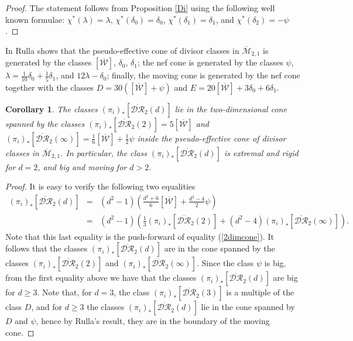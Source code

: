\documentclass[10pt]{amsart}
\newtheorem{cor}{Corollary}[section]
\theoremstyle{definition}
\begin{document}
\begin{proof}
 The statement follows from Proposition \ref{Di} using the following well known formulae: $\chi^*(\lambda)=\lambda$, $\chi^*(\delta_0)=\delta_0$, $\chi^*(\delta_1)=\delta_1$, and $\chi^*(\delta_2)=-\psi$.
\end{proof}

In \cite{MR2216265} Rulla shows that the pseudo-effective cone of divisor classes in ${\overline{\mathcal{M}}}_{2,1}$ is generated by the classes $\left[\overline{\mathcal{W}}\right]$, $\delta_0$, $\delta_1$; the nef cone is generated by the classes $\psi$, $\lambda=\frac{1}{10}\delta_0+\frac{1}{5}\delta_1$, and $12\lambda-\delta_0$; finally, the moving cone is generated by the nef cone together with the classes $D=30\left(\left[\overline{\mathcal{W}}\right]+\psi\right)$ and $E=20\left[\overline{\mathcal{W}}\right]+3\delta_0+6\delta_1$. 

\begin{cor}
The classes $(\pi_i)_*\left[ \overline{\mathcal{DR}}_2(d) \right]$ lie in the two-dimensional cone spanned by the classes $(\pi_i)_*\left[ \overline{\mathcal{DR}}_2(2) \right]=5\left[\overline{\mathcal{W}}\right]$ and $(\pi_i)_*\left[ \overline{\mathcal{DR}}_2(\infty) \right]=\frac{1}{6}\left[\overline{\mathcal{W}}\right]+\frac{1}{2}\psi$ inside the pseudo-effective cone of divisor classes in ${\overline{\mathcal{M}}}_{2,1}$. In particular, the class $(\pi_i)_*\left[ \overline{\mathcal{DR}}_2(d) \right]$ is extremal and rigid for $d=2$, and big and moving for $d>2$.
\end{cor}

\begin{proof}
It is easy to verify the following two equalities
\begin{eqnarray*}
 (\pi_i)_*\left[ \overline{\mathcal{DR}}_2(d) \right] &=& (d^2-1) \left(\frac{d^2+6}{6} \left[\overline{\mathcal{W}}\right] + \frac{d^2-4}{2}\psi\right) \\
&=& (d^2-1)\left(\frac{1}{3}(\pi_i)_*\left[ \overline{\mathcal{DR}}_2(2) \right] +(d^2-4) (\pi_i)_*\left[ \overline{\mathcal{DR}}_2(\infty) \right]\right).
\end{eqnarray*}
Note that this last equality is the push-forward of equality (\ref{2dimcone}).
It follows that the classes $(\pi_i)_*\left[ \overline{\mathcal{DR}}_2(d) \right]$ are in the cone spanned by the classes $(\pi_i)_*\left[ \overline{\mathcal{DR}}_2(2) \right]$ and $(\pi_i)_*\left[ \overline{\mathcal{DR}}_2(\infty) \right]$. Since the class $\psi$ is big, from the first equality above we have that the classes $(\pi_i)_*\left[ \overline{\mathcal{DR}}_2(d) \right]$ are big for $d\geq 3$. Note that, for $d=3$, the class $(\pi_i)_*\left[ \overline{\mathcal{DR}}_2(3) \right]$ is a multiple of the class $D$, and for $d\geq 3$ the classes $(\pi_i)_*\left[ \overline{\mathcal{DR}}_2(d) \right]$ lie in the cone spanned by $D$ and $\psi$, hence by Rulla's result, they are in the boundary of the moving cone.
\end{proof}
\end{document}
